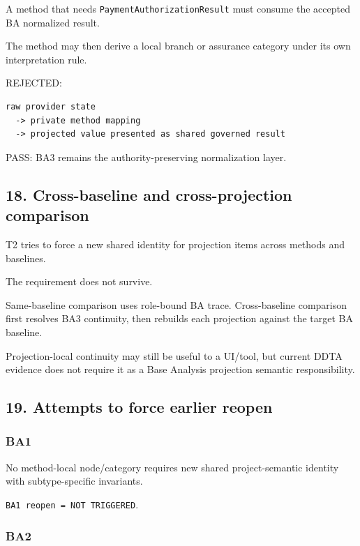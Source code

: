 \documentclass[11pt,a4paper]{article}
\begin{document}
A method that needs \texttt{PaymentAuthorizationResult} must consume the
accepted BA normalized result.

The method may then derive a local branch or assurance category under
its own interpretation rule.

REJECTED:

\begin{verbatim}
raw provider state
  -> private method mapping
  -> projected value presented as shared governed result
\end{verbatim}

PASS: BA3 remains the authority-preserving normalization layer.

\subsection{18. Cross-baseline and cross-projection
comparison}\label{18-cross-baseline-and-cross-projection-comparison}

T2 tries to force a new shared identity for projection items across
methods and baselines.

The requirement does not survive.

Same-baseline comparison uses role-bound BA trace. Cross-baseline
comparison first resolves BA3 continuity, then rebuilds each projection
against the target BA baseline.

Projection-local continuity may still be useful to a UI/tool, but
current DDTA evidence does not require it as a Base Analysis projection
semantic responsibility.

\subsection{19. Attempts to force earlier
reopen}\label{19-attempts-to-force-earlier-reopen}

\subsubsection{BA1}\label{ba1}

No method-local node/category requires new shared project-semantic
identity with subtype-specific invariants.

\texttt{BA1\ reopen\ =\ NOT\ TRIGGERED}.

\subsubsection{BA2}\label{ba2}
\end{document}
